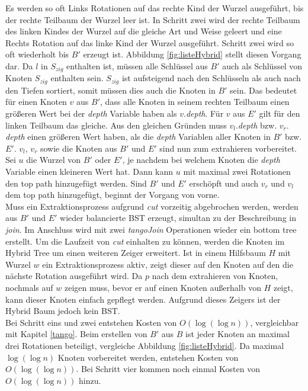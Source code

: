 \documentclass[a4paper,12pt]{article}
\begin{document}
 Es werden so oft Links Rotationen auf das rechte Kind der Wurzel ausgeführt, bis der rechte Teilbaum der Wurzel leer ist. In Schritt zwei wird der rechte Teilbaum des linken Kindes der Wurzel auf die gleiche Art und Weise geleert und eine Rechts Rotation auf das linke Kind der Wurzel ausgeführt. Schritt zwei wird so oft wiederholt bis $B'$ erzeugt ist. Abbildung \ref{fig:listeHybrid} stellt diesen Vorgang dar. Da $l$ in $S_{zig}$ enthalten ist, müssen alle Schlüssel aus $B'$ auch als Schlüssel von Knoten $S_{zig}$ enthalten sein.   $S_{zig}$ ist aufsteigend nach den Schlüsseln als auch nach den Tiefen sortiert, somit müssen dies auch die Knoten in $B'$ sein. Das bedeutet für einen Knoten $v$ aus $B'$, dass alle Knoten in seinem rechten Teilbaum einen größeren Wert bei der \textit{depth} Variable haben als $v.$\textit{depth}. Für  $v$ aus $E'$ gilt für den linken Teilbaum das gleiche. Aus den gleichen Gründen muss $v_l.$\textit{depth} bzw. $v_r.$\textit{depth} einen größeren Wert haben, als die \textit{depth} Variablen aller Knoten in $B'$ bzw. $E'$. $v_l$, $v_r$ sowie die Knoten aus $B'$ und $E'$ sind nun zum extrahieren vorbereitet. Sei $u$ die Wurzel von $B'$ oder $E'$, je nachdem bei welchem Knoten die \textit{depth} Variable einen kleineren Wert hat. Dann kann $u$ mit maximal zwei Rotationen den top path hinzugefügt werden. Sind $B'$ und  $E'$ erschöpft und auch $v_r$ und $v_l$ dem top path hinzugefügt, beginnt der Vorgang von vorne.\\
  Muss ein Extraktionsprozess aufgrund \textit{cut} vorzeitig abgebrochen werden, werden aus $B'$ und $E'$ wieder balancierte BST erzeugt, simultan zu der Beschreibung in \textit{join}. Im Anschluss wird mit zwei \textit{tangoJoin} Operationen wieder ein bottom tree erstellt. Um die Laufzeit von \textit{cut} einhalten zu können, werden die Knoten im Hybrid Tree um einen weiteren Zeiger erweitert. Ist in einem Hilfsbaum $H$ mit Wurzel $w$ ein Extraktionsprozess aktiv, zeigt dieser auf den Knoten auf den die nächste Rotation ausgeführt wird. Da $p$ nach dem extrahieren von Knoten, nochmals auf $w$ zeigen muss, bevor er auf einen Knoten außerhalb von $H$ zeigt, kann dieser Knoten einfach gepflegt werden. Aufgrund dieses Zeigers ist der Hybrid Baum jedoch kein BST.\\
Bei Schritt eins und zwei entstehen Kosten von $O\left(\log \left(\log n\right)\right)$, vergleichbar mit Kapitel \ref{tango}. Beim erstellen von $B'$ aus $B$ ist jeder Knoten an maximal drei Rotationen beteiligt, vergleiche Abbildung \ref{fig:listeHybrid}. Da maximal  $\log\left(\log n\right)$ Knoten vorbereitet werden, entstehen Kosten von  $O\left(\log\left(\log n\right)\right)$. Bei Schritt vier kommen noch einmal Kosten von $O\left(\log\left(\log n\right)\right)$ hinzu.
\end{document}
